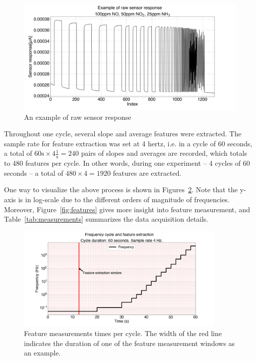 \begin{figure}[!htb]
	\centering
	\includegraphics[width=1\textwidth]{../figures/raw-response.png}
	\caption{An example of raw sensor response}
	\label{fig:raw}
\end{figure}

Throughout one cycle, several slope and average features were extracted. The sample rate for feature extraction was set at 4 \acrshort{hertz}, i.e. in a cycle of 60 seconds, a total of $60 \text{s} \times 4 \frac{1}{\text{s}} = 240$ pairs of slopes and averages are recorded, which totals to 480 features per cycle. In other words, during one experiment --  4 cycles of 60 seconds -- a total of $480 \times 4 = 1920$ features are extracted. 

One way to visualize the above process is shown in Figures~\ref{fig:feat-window}. Note that the y-axis is in log-scale due to the different orders of magnitude of frequencies. Moreover, Figure~\ref{fig:features} gives more insight into feature measurement, and Table~\ref{tab:measurements} summarizes the data acquisition details.

\begin{figure}[!htb]
	\centering
	\includegraphics[width=0.9\textwidth]{../figures/measurement-windows.png}
	
	\caption{Feature measurements times per cycle. The width of the red line indicates the duration of one of the feature measurement windows as an example.}
	\label{fig:feat-window}
\end{figure} 

